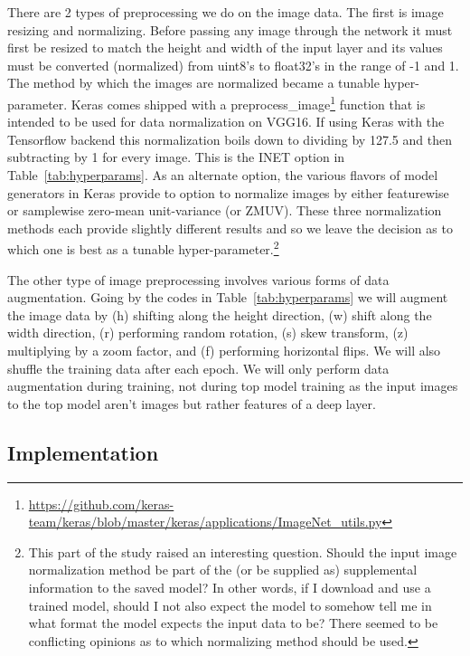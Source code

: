 \documentclass[12pt,journal,compsoc]{IEEEtran}
\begin{document}
There are 2 types of preprocessing we do on the image data. The first is image resizing and normalizing. Before passing any image through the network it must first be resized to match the height and width of the input layer and its values must be converted (normalized) from uint8's to float32's in the range of -1 and 1.  The method by which the images are normalized became a tunable hyper-parameter.  Keras comes shipped with a preprocess\_image\footnote{\url{https://github.com/keras-team/keras/blob/master/keras/applications/ImageNet_utils.py}} function that is intended to be used for data normalization on VGG16.  If using Keras with the Tensorflow backend this normalization boils down to dividing by 127.5 and then subtracting by 1 for every image.  This is the INET option in Table~\ref{tab:hyperparams}. As an alternate option, the various flavors of model generators in Keras provide to option to normalize images by either featurewise or samplewise zero-mean unit-variance (or ZMUV).  These three normalization methods each provide slightly different results and so we leave the decision as to which one is best as a tunable hyper-parameter.\footnote{This part of the study raised an interesting question. Should the input image normalization method be part of the (or be supplied as) supplemental information to the saved model?  In other words, if I download and use a trained model, should I not also expect the model to somehow tell me in what format the model expects the input data to be? There seemed to be conflicting opinions as to which normalizing method should be used.}

The other type of image preprocessing involves various forms of data augmentation.  Going by the codes in Table~\ref{tab:hyperparams} we will augment the image data by (h) shifting along the height direction, (w) shift along the width direction, (r) performing random rotation, (s) skew transform, (z) multiplying by a zoom factor, and (f) performing horizontal flips.  We will also shuffle the training data after each epoch. We will only perform data augmentation during training, not during top model training as the input images to the top model aren't images but rather features of a deep layer.

\subsection{Implementation}
\end{document}
